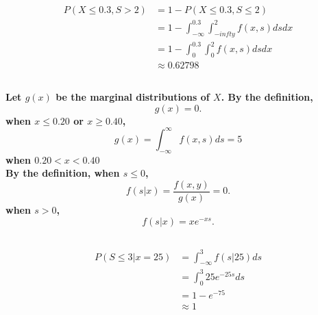 \documentclass{article}
\begin{document}
    \section{}
        \subsection{}
            \paragraph{
                \begin{equation}
                    \begin{split}
                        P(X\leq 0.3, S >2)
                        &=1-P(X\leq 0.3 , S \leq 2)\\
                        &=1-\int _{-\infty} ^{0.3} \int _{-infty} ^2 f(x,s) ds dx\\
                        &=1-\int _0 ^{0.3} \int _0 ^2 f(x,s) ds dx\\
                        &\approx 0.62798
                    \end{split}
                \end{equation}
            }
        \subsection{}   
            \paragraph{
                Let $g(x)$ be the marginal distributions of $X$. By the definition,
                $$g(x)=0.$$
                when $x\leq 0.20$ or $x\geq 0.40$,
                $$g(x)=\int _{-\infty} ^{\infty} f(x,s) ds=5$$
                when $0.20<x<0.40$\\
                By the definition, when $s\leq 0$,
                $$f(s|x)=\frac{f(x,y)}{g(x)}=0.$$
                when $s>0$,
                $$f(s|x)=xe^{-xs}.$$
            }      
        \subsection{}
            \paragraph{
                \begin{equation}
                    \begin{split}
                        P(S\leq 3|x=25)
                        &=\int_{-\infty} ^3 f(s|25) ds\\
                        &=\int_0 ^3 25e^{-25s} ds\\
                        &=1-e^{-75}\\
                        &\approx 1
                    \end{split}
                \end{equation}
            }
\end{document}
